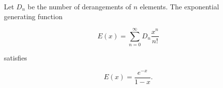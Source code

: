Let $D_n$ be the number of derangements of $n$ elements. The exponential generating function

$$E(x) = \sum_{n=0}^{\infty} D_n \frac{x^n}{n!}$$

satisfies

$$E(x) = \frac{e^{-x}}{1-x}.$$
